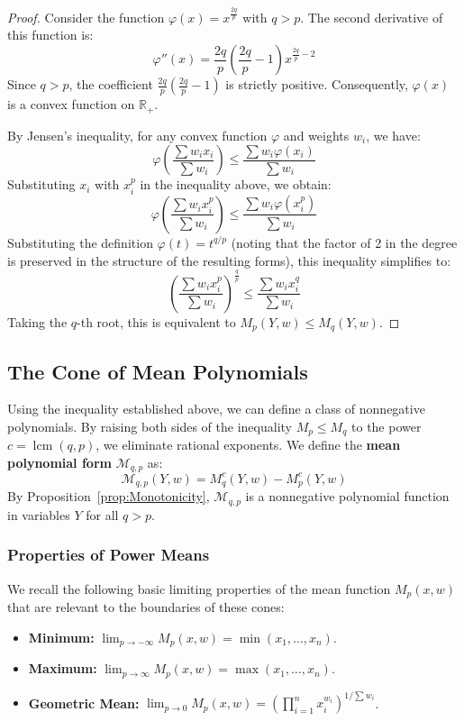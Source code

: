 \documentclass{article}
\begin{document}
\begin{proof}
Consider the function $\varphi(x) = x^{\frac{2q}{p}}$ with $q > p$. The second derivative of this function is:
\[
\varphi''(x) = \frac{2q}{p} \left( \frac{2q}{p} - 1 \right) x^{\frac{2q}{p} - 2}
\]
Since $q > p$, the coefficient $\frac{2q}{p}(\frac{2q}{p}-1)$ is strictly positive. Consequently, 
$\varphi(x)$ is a convex function on $\mathbb{R}_+$.

By Jensen's inequality, for any convex function $\varphi$ and weights $w_i$, we have:
\[
\varphi\left( \frac{\sum w_i x_i}{\sum w_i} \right) \le \frac{\sum w_i \varphi(x_i)}{\sum w_i}
\]
Substituting $x_i$ with $x_i^p$ in the inequality above, we obtain:
\[
\varphi\left( \frac{\sum w_i x_i^p}{\sum w_i} \right) \le \frac{\sum w_i \varphi(x_i^p)}{\sum w_i}
\]
Substituting the definition $\varphi(t) = t^{q/p}$ (noting that the factor of 2 in the degree is preserved in the 
structure of the resulting forms), this inequality simplifies to:
\[
\left( \frac{\sum w_i x_i^p}{\sum w_i} \right)^{\frac{q}{p}} \le \frac{\sum w_i x_i^q}{\sum w_i}
\]
Taking the $q$-th root, this is equivalent to $M_p(Y, w) \le M_q(Y, w)$.
\end{proof}

\subsection{The Cone of Mean Polynomials}

Using the inequality established above, we can define a class of nonnegative polynomials. By raising both sides of 
the inequality $M_p \le M_q$ to the power $c = \operatorname{lcm}(q, p)$, we eliminate rational exponents. 
We define the \textbf{mean polynomial form} $\mathcal{M}_{q,p}$ as:
\[
\mathcal{M}_{q,p}(Y, w) = M_q^c(Y, w) - M_p^c(Y, w)
\]
By Proposition~\ref{prop:Monotonicity}, $\mathcal{M}_{q,p}$ is a nonnegative polynomial function in variables $Y$ for all $q > p$.

\subsubsection*{Properties of Power Means}
We recall the following basic limiting properties of the mean function $M_p(x, w)$ that are relevant to the boundaries 
of these cones:

\begin{itemize}
    \item \textbf{Minimum:} $\lim_{p \to -\infty} M_p(x, w) = \min(x_1, \dots, x_n)$.
    \item \textbf{Maximum:} $\lim_{p \to \infty} M_p(x, w) = \max(x_1, \dots, x_n)$.
    \item \textbf{Geometric Mean:} $\lim_{p \to 0} M_p(x, w) = \left( \prod_{i=1}^n x_i^{w_i} \right)^{1 / \sum w_i}$.
\end{itemize}
\end{document}
